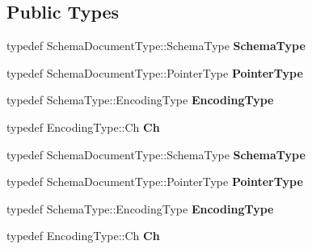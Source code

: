 \subsection*{Public Types}
\begin{DoxyCompactItemize}
\item 
typedef Schema\+Document\+Type\+::\+Schema\+Type {\bfseries Schema\+Type}\hypertarget{class_generic_schema_validator_ac79628f00f6720bbabb70b44f0d076a0}{}\label{class_generic_schema_validator_ac79628f00f6720bbabb70b44f0d076a0}

\item 
typedef Schema\+Document\+Type\+::\+Pointer\+Type {\bfseries Pointer\+Type}\hypertarget{class_generic_schema_validator_ae0c6c9a9c0ff6bae80e75c6705f2668b}{}\label{class_generic_schema_validator_ae0c6c9a9c0ff6bae80e75c6705f2668b}

\item 
typedef Schema\+Type\+::\+Encoding\+Type {\bfseries Encoding\+Type}\hypertarget{class_generic_schema_validator_acf1c5361bb96da87d23167d8720b1ea5}{}\label{class_generic_schema_validator_acf1c5361bb96da87d23167d8720b1ea5}

\item 
typedef Encoding\+Type\+::\+Ch {\bfseries Ch}\hypertarget{class_generic_schema_validator_a8b7dab5a0cda9cc0adaefb4401d260c1}{}\label{class_generic_schema_validator_a8b7dab5a0cda9cc0adaefb4401d260c1}

\item 
typedef Schema\+Document\+Type\+::\+Schema\+Type {\bfseries Schema\+Type}\hypertarget{class_generic_schema_validator_ac79628f00f6720bbabb70b44f0d076a0}{}\label{class_generic_schema_validator_ac79628f00f6720bbabb70b44f0d076a0}

\item 
typedef Schema\+Document\+Type\+::\+Pointer\+Type {\bfseries Pointer\+Type}\hypertarget{class_generic_schema_validator_ae0c6c9a9c0ff6bae80e75c6705f2668b}{}\label{class_generic_schema_validator_ae0c6c9a9c0ff6bae80e75c6705f2668b}

\item 
typedef Schema\+Type\+::\+Encoding\+Type {\bfseries Encoding\+Type}\hypertarget{class_generic_schema_validator_acf1c5361bb96da87d23167d8720b1ea5}{}\label{class_generic_schema_validator_acf1c5361bb96da87d23167d8720b1ea5}

\item 
typedef Encoding\+Type\+::\+Ch {\bfseries Ch}\hypertarget{class_generic_schema_validator_a8b7dab5a0cda9cc0adaefb4401d260c1}{}\label{class_generic_schema_validator_a8b7dab5a0cda9cc0adaefb4401d260c1}

\end{DoxyCompactItemize}
